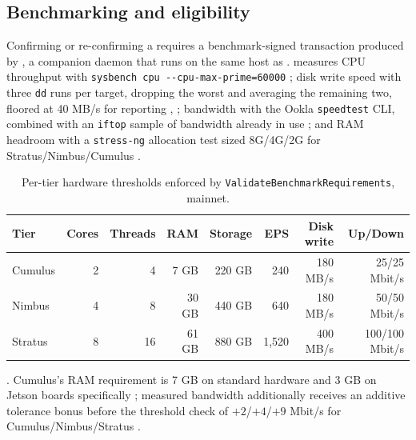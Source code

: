 \subsection{Benchmarking and eligibility}
\label{sec:consensus-benchmark}

Confirming or re-confirming a \FluxNode requires a benchmark-signed transaction produced by
\fluxbench, a companion daemon that runs on the same host as \fluxd. \fluxbench measures CPU
throughput with \texttt{sysbench cpu -\allowbreak{}-\allowbreak{}cpu-\allowbreak{}max-\allowbreak{}prime=60000}
\shipped {}; disk write speed with three
\texttt{dd} runs per target, dropping the worst and averaging the remaining two, floored at
40 MB/s for reporting \shipped {},
; bandwidth with the Ookla \texttt{speedtest} CLI,
combined with an \texttt{iftop} sample of bandwidth already in use
\shipped {}; and RAM headroom with
a \texttt{stress-ng} allocation test sized 8G/4G/2G for Stratus/Nimbus/Cumulus
\shipped {}.

\begin{table}[H]
\centering
\caption{Per-tier hardware thresholds enforced by \texttt{Validate\allowbreak{}Benchmark\allowbreak{}Requirements}, mainnet.}
\label{tab:benchmark-thresholds}
\begin{tabular}{lrrrrrrr}
\toprule
Tier & Cores & Threads & RAM & Storage & EPS & Disk write & Up/Down \\
\midrule
Cumulus & 2 & 4 & 7 GB & 220 GB & 240 & 180 MB/s & 25/25 Mbit/s \\
Nimbus  & 4 & 8 & 30 GB & 440 GB & 640 & 180 MB/s & 50/50 Mbit/s \\
Stratus & 8 & 16 & 61 GB & 880 GB & 1{,}520 & 400 MB/s & 100/100 Mbit/s \\
\bottomrule
\end{tabular}
\end{table}
\shipped {}. Cumulus's RAM requirement is 7 GB on
standard hardware and 3 GB on Jetson boards specifically
\shipped {}; measured bandwidth additionally
receives an additive tolerance bonus before the threshold check of $+2$/$+4$/$+9$ Mbit/s for
Cumulus/Nimbus/Stratus \shipped {}.

